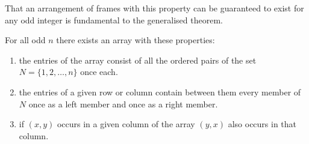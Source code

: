 That an arrangement of frames with this property can be guaranteed to exist for any odd integer is fundamental to the generalised theorem.

\begin{lemma}
For all odd $n$ there exists an array with these properties:
\begin{enumerate}
  \item{the entries of the array consist of all the ordered pairs of the set $N = \{1, 2, \ldots, n\}$ once each.}
  \item{the entries of a given row or column contain between them every member of $N$ once as a left member and once as a right member.}
  \item{if $(x,y)$ occurs in a given column of the array $(y,x)$ also occurs in that column.}
\end{enumerate}
\end{lemma}

